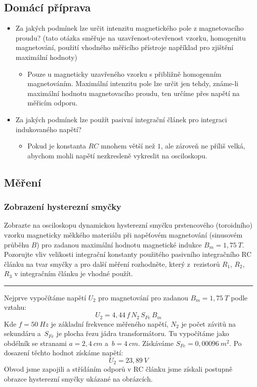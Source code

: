 \documentclass[a4paper,12pt]{article}
\begin{document}
\subsection{Domácí příprava}
\begin{itemize}
  \item Za jakých podmínek lze určit intenzitu magnetického pole z magnetovacího proudu? (tato otázka směřuje na uzavřenost-otevřenost vzorku, homogenitu magnetování, použití vhodného měřicího přístroje například pro zjištění maximální hodnoty)
    \begin{itemize}
      \item Pouze u magneticky uzavřeného vzorku s přibližně homogenním magnetováním. Maximální intenzitu pole lze určit jen tehdy, známe-li maximální hodnotu magnetovacího proudu, ten určíme přes napětí na měřicím odporu.
    \end{itemize}
  \item Za jakých podmínek lze použít pasivní integrační článek pro integraci indukovaného napětí?
    \begin{itemize}
      \item Pokud je konstanta $RC$ mnohem větší než $1$, ale zároveň ne příliš velká, abychom mohli napětí nezkresleně vykreslit na osciloskopu.
    \end{itemize}
\end{itemize}

\subsection{Měření}
\subsubsection{Zobrazení hysterezní smyčky}
Zobrazte na osciloskopu dynamickou hysterezní smyčku prstencového (toroidního) vzorku
magneticky měkkého materiálu při napěťovém magnetování (sinusovém průběhu $B$) pro zadanou
maximální hodnotu magnetické indukce $B_m = 1,75\ T$. Pozorujte vliv velikosti integrační konstanty
použitého pasivního integračního RC článku na tvar smyčky a pro další měření rozhodněte, který z~rezistorů $R_1$, $R_2$, $R_3$ v integračním článku je vhodné použít.
\par\noindent\rule{\textwidth}{0.4pt}

Nejprve vypočítáme napětí $U_2$ pro magnetování pro zadanou $B_m = 1,75\ T$ podle vztahu:
$$
U_2 = 4{,}44\, f\, N_2\, S_{Fe}\, B_m
$$
Kde $f=50\ Hz$ je základní frekvence měřeného napětí, $N_2$ je počet závitů na sekundáru a~$S_{Fe}$ je plocha řezu jádra transformátoru. Tu vypočítáme jako obdélník se stranami $a=2,4\ cm$ a~$b=4\ cm$. Získáváme $S_{Fe}=0,00096\ m^2$. Po dosazení těchto hodnot získáme napětí:
$$
U_2 = 23,89\ V
$$
Obvod jsme zapojili a střídáním odporů v RC článku jsme získali postupně obrazce hysterezní smyčky ukázané na obrázcích.
\end{document}
